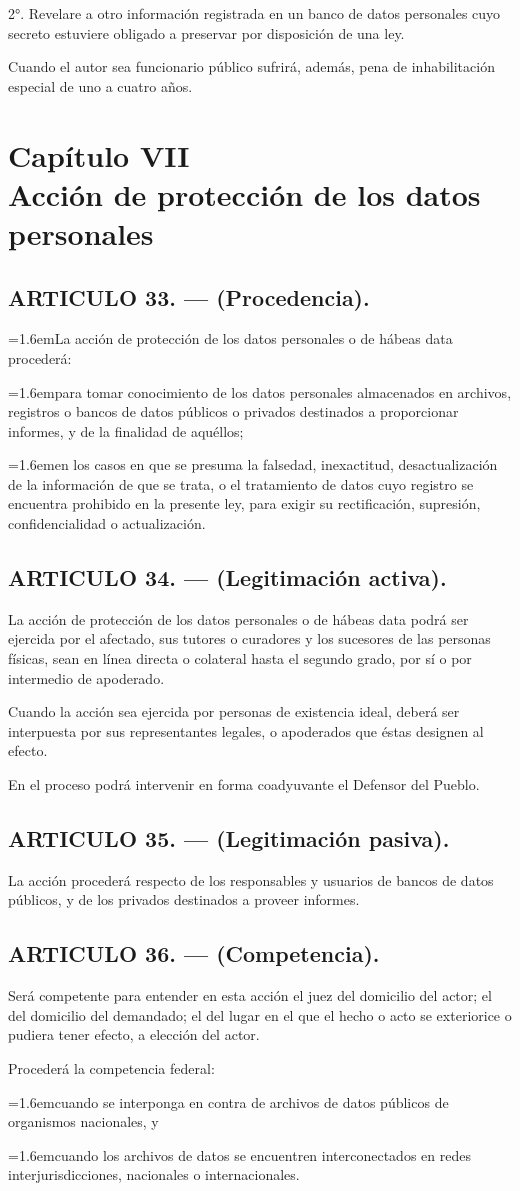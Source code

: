 \documentclass[10pt,a4paper]{article}
\newcommand{\capitulo}[2]{\section[#1 --- #2]{#1\\[2pt]#2}}
\newcommand{\articulo}[1]{\subsection{#1}}
\newcommand{\inciso}[2]{\par{\hangindent=1.6em\hangafter=1\makebox[1.6em][l]{#1}#2\par}}
\begin{document}
2°. Revelare a otro información registrada en un banco de datos personales cuyo secreto estuviere obligado a preservar por disposición de una ley.

Cuando el autor sea funcionario público sufrirá, además, pena de inhabilitación especial de uno a cuatro años\textquotesingle{}.

\capitulo{Capítulo VII}{Acción de protección de los datos personales}
\articulo{ARTICULO 33. — (Procedencia).}
\inciso{1.}{La acción de protección de los datos personales o de hábeas data procederá:}

\inciso{a)}{para tomar conocimiento de los datos personales almacenados en archivos, registros o bancos de datos públicos o privados destinados a proporcionar informes, y de la finalidad de aquéllos;}

\inciso{b)}{en los casos en que se presuma la falsedad, inexactitud, desactualización de la información de que se trata, o el tratamiento de datos cuyo registro se encuentra prohibido en la presente ley, para exigir su rectificación, supresión, confidencialidad o actualización.}

\articulo{ARTICULO 34. — (Legitimación activa).}
La acción de protección de los datos personales o de hábeas data podrá ser ejercida por el afectado, sus tutores o curadores y los sucesores de las personas físicas, sean en línea directa o colateral hasta el segundo grado, por sí o por intermedio de apoderado.

Cuando la acción sea ejercida por personas de existencia ideal, deberá ser interpuesta por sus representantes legales, o apoderados que éstas designen al efecto.

En el proceso podrá intervenir en forma coadyuvante el Defensor del Pueblo.

\articulo{ARTICULO 35. — (Legitimación pasiva).}
La acción procederá respecto de los responsables y usuarios de bancos de datos públicos, y de los privados destinados a proveer informes.

\articulo{ARTICULO 36. — (Competencia).}
Será competente para entender en esta acción el juez del domicilio del actor; el del domicilio del demandado; el del lugar en el que el hecho o acto se exteriorice o pudiera tener efecto, a elección del actor.

Procederá la competencia federal:

\inciso{a)}{cuando se interponga en contra de archivos de datos públicos de organismos nacionales, y}

\inciso{b)}{cuando los archivos de datos se encuentren interconectados en redes interjurisdicciones, nacionales o internacionales.}
\end{document}

